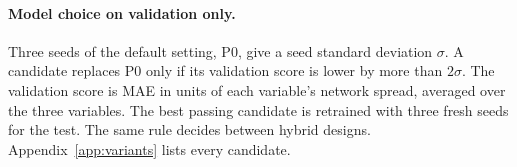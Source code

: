\paragraph{Model choice on validation only.}
Three seeds of the default setting, P0, give a seed standard deviation $\sigma$. A candidate replaces P0 only if its
validation score is lower by more than $2\sigma$. The validation score is MAE in units of each variable's network
spread, averaged over the three variables. The best passing candidate is retrained with three fresh seeds for the
test. The same rule decides between hybrid designs. Appendix~\ref{app:variants} lists every candidate.
